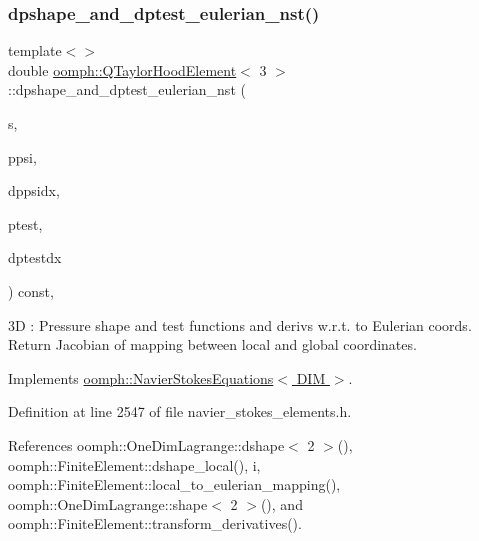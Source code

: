 \subsubsection{\texorpdfstring{dpshape\+\_\+and\+\_\+dptest\+\_\+eulerian\+\_\+nst()}{dpshape\_and\_dptest\_eulerian\_nst()}\hspace{0.1cm}{\footnotesize\ttfamily [3/3]}}
{\footnotesize\ttfamily template$<$$>$ \\
double \hyperlink{classoomph_1_1QTaylorHoodElement}{oomph\+::\+Q\+Taylor\+Hood\+Element}$<$ 3 $>$\+::dpshape\+\_\+and\+\_\+dptest\+\_\+eulerian\+\_\+nst (\begin{DoxyParamCaption}\item[{const \hyperlink{classoomph_1_1Vector}{Vector}$<$ double $>$ \&}]{s,  }\item[{\hyperlink{classoomph_1_1Shape}{Shape} \&}]{ppsi,  }\item[{\hyperlink{classoomph_1_1DShape}{D\+Shape} \&}]{dppsidx,  }\item[{\hyperlink{classoomph_1_1Shape}{Shape} \&}]{ptest,  }\item[{\hyperlink{classoomph_1_1DShape}{D\+Shape} \&}]{dptestdx }\end{DoxyParamCaption}) const\hspace{0.3cm}{\ttfamily [inline]}, {\ttfamily [virtual]}}

3D \+: Pressure shape and test functions and derivs w.\+r.\+t. to Eulerian coords. Return Jacobian of mapping between local and global coordinates. 

Implements \hyperlink{classoomph_1_1NavierStokesEquations_a2f3024a4d370ec45ddffacb236bc2bb2}{oomph\+::\+Navier\+Stokes\+Equations$<$ D\+I\+M $>$}.



Definition at line 2547 of file navier\+\_\+stokes\+\_\+elements.\+h.



References oomph\+::\+One\+Dim\+Lagrange\+::dshape$<$ 2 $>$(), oomph\+::\+Finite\+Element\+::dshape\+\_\+local(), i, oomph\+::\+Finite\+Element\+::local\+\_\+to\+\_\+eulerian\+\_\+mapping(), oomph\+::\+One\+Dim\+Lagrange\+::shape$<$ 2 $>$(), and oomph\+::\+Finite\+Element\+::transform\+\_\+derivatives().

\mbox{\label{classoomph_1_1QTaylorHoodElement_a25f796f83e490de92186d63ee015d708}} 
